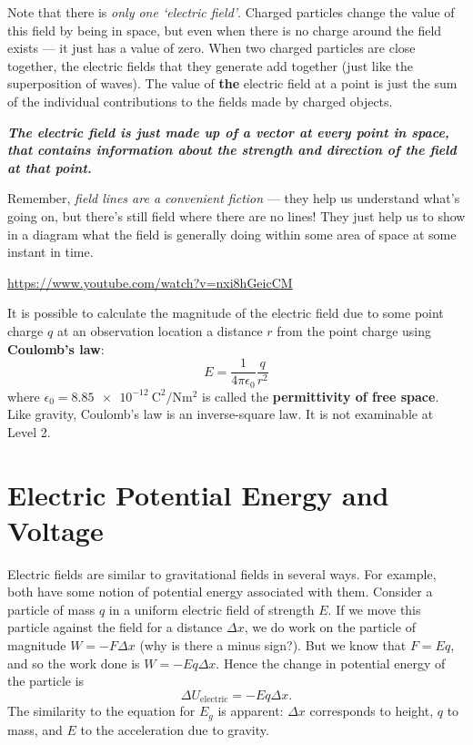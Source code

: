 \documentclass[a4paper]{amsbook}
\begin{document}
Note that there is \textit{only one `electric field'}. Charged particles change the value of this field by being in space, but even when
there is no charge around the field exists --- it just has a value of zero. When two charged particles are close together, the electric
fields that they generate add together (just like the superposition of waves). The value of \textbf{the} electric field at a point is just
the sum of the individual contributions to the fields made by charged objects.

\textbf{\textit{The electric field is just made up of a vector at every point in space, that contains information about the strength and
direction of the field at that point.}}

Remember, \textit{field lines are a convenient fiction} --- they help us understand what's going on, but there's still field where there are
no lines! They just help us to show in a diagram what the field is generally doing within some area of space at some instant in time.

\begin{center}
\begin{tcolorbox}[width=0.8\textwidth,colback={red},title={\textbf{Go and watch...}},colbacktitle=yellow,coltitle=blue]
  \textcolor{white}{\url{https://www.youtube.com/watch?v=nxi8hGeicCM}}
\end{tcolorbox}
\end{center}

It is possible to calculate the magnitude of the electric field due to some point charge $ q $ at an observation location a distance $ r $
from the point charge using \textbf{Coulomb's law}:
\begin{equation}
  E = \frac{1}{4\pi \epsilon_0} \frac{q}{r^2}
\end{equation}
where $ \epsilon_0 = \SI{8.85e-12}{\coulomb\squared\per\newton\metre\squared} $ is called the \textbf{permittivity of free space}.
Like gravity, Coulomb's law is an inverse-square law. It is not examinable at Level 2.

\section{Electric Potential Energy and Voltage}
Electric fields are similar to gravitational fields in several ways. For example, both have some notion of potential energy associated
with them. Consider a particle of mass $ q $ in a uniform electric field of strength $ E $. If we move this particle against the field
for a distance $ \Delta x $, we do work on the particle of magnitude $ W = -F \Delta x $ (why is there a minus sign?).  But we know that $ F = Eq $, and so the work
done is $ W = -Eq \Delta x $. Hence the change in potential energy of the particle is
\begin{equation}
  \Delta U_{\text{electric}} = -E q \Delta x.
\end{equation}
The similarity to the equation for $ E_g $ is apparent: $ \Delta x $ corresponds to height, $ q $ to mass, and $ E $ to the acceleration
due to gravity.
\end{document}
